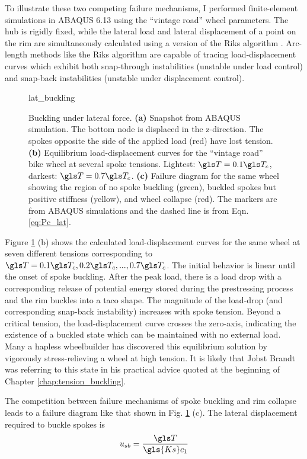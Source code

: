 \documentclass[\rootdir/thesis.tex]{subfiles}
\begin{document}
To illustrate these two competing failure mechanisms, I performed finite-element simulations in ABAQUS 6.13 using the ``vintage road'' wheel parameters. The hub is rigidly fixed, while the lateral load and lateral displacement of a point on the rim are simultaneously calculated using a version of the Riks algorithm \cite{Crisfield1981}. Arc-length methods like the Riks algorithm are capable of tracing load-displacement curves which exhibit both snap-through instabilities (unstable under load control) and snap-back instabilities (unstable under displacement control).

\begin{figure}
\centering
{lat_buckling} 
\caption[Buckling under lateral force]{Buckling under lateral force. \textbf{(a)} Snapshot from ABAQUS simulation. The bottom node is displaced in the z-direction. The spokes opposite the side of the applied load (red) have lost tension. \textbf{(b)} Equilibrium load-displacement curves for the ``vintage road'' bike wheel at several spoke tensions. Lightest: $\T=0.1\T_c$, darkest: $\T=0.7\T_c$. \textbf{(c)} Failure diagram for the same wheel showing the region of no spoke buckling (green), buckled spokes but positive stiffness (yellow), and wheel collapse (red). The markers are from ABAQUS simulations and the dashed line is from Eqn. \eqref{eq:Pc_lat}.}
\label{fig:lat_buckling}
\end{figure}

Figure \ref{fig:lat_buckling} (b) shows the calculated load-displacement curves for the same wheel at seven different tensions corresponding to $\T=0.1\T_c, 0.2\T_c,...,0.7\T_c$. The initial behavior is linear until the onset of spoke buckling. After the peak load, there is a load drop with a corresponding release of potential energy stored during the prestressing process and the rim buckles into a taco shape. The magnitude of the load-drop (and corresponding snap-back instability) increases with spoke tension. Beyond a critical tension, the load-displacement curve crosses the zero-axis, indicating the existence of a buckled state which can be maintained with no external load. Many a hapless wheelbuilder has discovered this equilibrium solution by vigorously stress-relieving a wheel at high tension. It is likely that Jobst Brandt was referring to this state in his practical advice quoted at the beginning of Chapter \ref{chap:tension_buckling}.

The competition between failure mechanisms of spoke buckling and rim collapse leads to a failure diagram like that shown in Fig. \ref{fig:lat_buckling} (c). The lateral displacement required to buckle spokes is
\begin{equation}
u_{sb} = \frac{\T}{\gls{Ks} c_1}
\end{equation}
\end{document}
